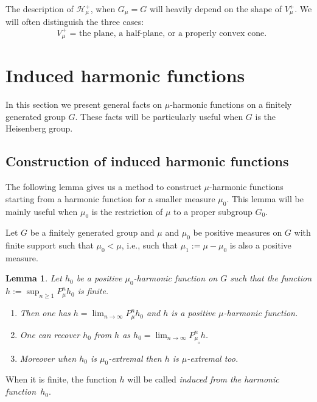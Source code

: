 \documentclass[11pt]{article}
\newcommand{\ie}{i.e.,\xspace}
\numberwithin{equation}{section}
\let\mathcal\mathscr
\newenvironment{enumeratei}
{\bgroup\def\theenumi{\roman{enumi}}\def\theenumii{\arabic{enumii}}\begin{enumerate}}
{\end{enumerate}\egroup}
\newtheorem{Lem}[Thm]{Lemma}
\theoremstyle{definition}
\newcommand{\mc}[1]{\mathcal{ #1}}
\let\bq\relax
\let\eq\relax
\let\ra\to
\begin{document}
The description of $\mc H_\mu^+$, when $G_\mu=G$ will heavily depend on the shape of $V^+_\mu$.
We will often distinguish the three cases:
\begin{equation}
\label{eqnvmuphc}
\mbox{ $V^+_\mu$ = the plane, a half-plane, or a properly convex cone.}
\end{equation}

\section{Induced harmonic functions}
\label{secproof}

In this section we present general facts on $\mu$-harmonic functions
on a finitely generated group $G$. These facts will be particularly useful
when $G$ is the Heisenberg group.

\subsection{Construction of induced harmonic functions}
\label{secconind}

\bq
The following lemma gives us a method to construct
$\mu$-harmonic functions starting from a harmonic function
for a smaller measure $\mu_0$.
This lemma will be mainly useful when $\mu_0$ is the restriction of $\mu$
to a proper subgroup $G_0$.
\eq

Let $G$ be a finitely generated group and
$\mu$ and $\mu_0$ be positive measures on $G$ with finite support
such that $\mu_0 <\mu$, \ie such that $\mu_1:=\mu-\mu_0$ is also a positive measure.

\begin{Lem}
\label{lemconind}
Let $h_0$ be a positive $\mu_0$-harmonic function on $G$ such that
the function $h:=\sup_{n\geq 1}P^n_{\mu}h_0$ is finite.
\begin{enumeratei}
\item\label{lemconindi}
Then
one has
$h=\lim_{n\ra\infty}P^n_{\mu}h_0$ and
$h$ is a positive $\mu$-harmonic function.
\item\label{lemconindii}
One can recover $h_0$ from $h$ as
$h_0=\lim_{n\ra\infty}P^n_{\mu_{_0}}h$.
\item\label{lemconindiii}
Moreover when $h_0$ is $\mu_0$-extremal then $h$ is $\mu$-extremal too.
\end{enumeratei}
\end{Lem}

When it is finite, the function $h$ will be called \emph{induced from the harmonic function~$h_0$}.
\end{document}
